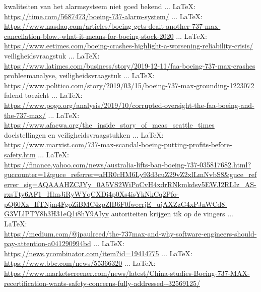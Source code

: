 \begin{thebibliography}{99}
kwaliteiten van het alarmsysteem niet goed bekend
 ... \LaTeX:\\ \url{https://time.com/5687473/boeing-737-alarm-system/}
 ... \LaTeX:\\ \url{https://www.nasdaq.com/articles/boeing-gets-dealt-another-737-max-cancellation-blow.-what-it-means-for-boeing-stock-2020}
 ... \LaTeX:\\ \url{https://www.eetimes.com/boeing-crashes-highlight-a-worsening-reliability-crisis/}
veiligheidsvraagstuk
 ... \LaTeX:\\ \url{https://www.latimes.com/business/story/2019-12-11/faa-boeing-737-max-crashes}
probleemanalyse, veiligheidsvraagstuk
 ... \LaTeX:\\ \url{https://www.politico.com/story/2019/03/15/boeing-737-max-grounding-1223072}
falend toezicht
 ... \LaTeX:\\ \url{https://www.pogo.org/analysis/2019/10/corrupted-oversight-the-faa-boeing-and-the-737-max/}
 ... \LaTeX:\\ \url{https://www.afacwa.org/the_inside_story_of_mcas_seattle_times}
doelstellingen en veiligheidsvraagstukken
 ... \LaTeX:\\ \url{https://www.marxist.com/737-max-scandal-boeing-putting-profits-before-safety.htm}
 ... \LaTeX:\\ \url{https://finance.yahoo.com/news/australia-lifts-ban-boeing-737-035817682.html?guccounter=1&guce_referrer=aHR0cHM6Ly93d3cuZ29vZ2xlLmNvbS8&guce_referrer_sig=AQAAAHZCJYy_0A5VS2WiPoCvH4xdrRNkmkdsv5EWJ2RLIz_AS-rxsTty6AF1_HlmJiRyWYqCXDi4p0Xs4isYkNkCq2Pfo-pQ60Xz_IfTNjm4FgoZiBMC4zpZlB6F0fwecrjE_ujAXZzG4xPJnWCd8-G3VLlPTY8h3H31eQ1i8hY9AIyy}
autoriteiten krijgen tik op de vingers
 ... \LaTeX:\\ \url{https://medium.com/@jpaulreed/the-737max-and-why-software-engineers-should-pay-attention-a041290994bd}
 ... \LaTeX:\\ \url{https://news.ycombinator.com/item?id=19414775}
 ... \LaTeX:\\ \url{https://www.bbc.com/news/55366320}
 ... \LaTeX:\\ \url{https://www.marketscreener.com/news/latest/China-studies-Boeing-737-MAX-recertification-wants-safety-concerns-fully-addressed--32569125/}

\end{thebibliography}
